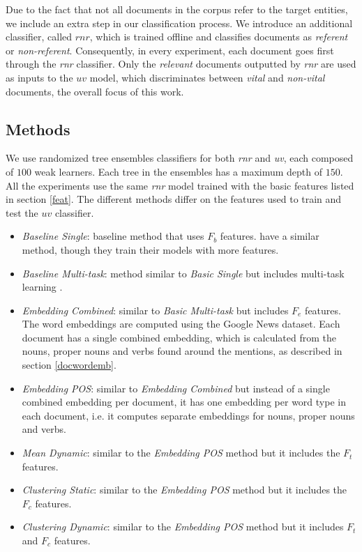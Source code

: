 \documentclass{article}
\begin{document}
Due to the fact that not all documents in the corpus refer to the target entities, we include an extra step in our classification process. We introduce an additional classifier, called $rnr$, which is trained offline and classifies documents as \emph{referent} or \emph{non-referent}.
Consequently, in every experiment, each document goes first through the \emph{rnr} classifier. Only the \emph{relevant} documents outputted by \emph{rnr} are used as inputs to the $uv$ model, which discriminates between \emph{vital} and \emph{non-vital} documents, the overall focus of this work.

\subsection{Methods}
\label{expe}

We use randomized tree ensembles classifiers \cite{GEW06a} for both \emph{rnr} and \emph{uv}, each composed of $100$ weak learners. Each tree in the ensembles has a maximum depth of $150$.
%
All the experiments use the same \emph{rnr} model trained with the basic features listed in section \ref{feat}.
The different methods differ on the features used to train and test the $uv$ classifier.

\begin{itemize}
  \item {\textit{Baseline Single}}: baseline method that uses $F_b$ features. \citet{jingang13, bellogin13} have a similar method, though they train their models with more features.
  \item {\textit{Baseline Multi-task}}: method similar to {\textit{Basic Single}} but includes multi-task learning \cite{Caruana93multitasklearning}.
  \item {\textit{Embedding Combined}}: similar to {\textit{Basic Multi-task}} but includes $F_e$ features. The word embeddings are computed using the Google News dataset. Each document has a single combined embedding, which is calculated from the nouns, proper nouns and verbs found around the mentions, as described in section \ref{docwordemb}.
  \item {\textit{Embedding POS}}: similar to {\textit{Embedding Combined}} but instead of a single combined embedding per document, it has one embedding per word type in each document, i.e. it computes separate embeddings for nouns, proper nouns and verbs. %
  \item {\textit{Mean Dynamic}}: similar to the {\textit{Embedding POS}} method but it includes the $F_t$ features.
  \item {\textit{Clustering Static}}: similar to the {\textit{Embedding POS}} method but it includes the $F_c$ features.
  \item {\textit{Clustering Dynamic}}: similar to the {\textit{Embedding POS}} method but it includes $F_t$ and $F_c$ features.
\end{itemize}
\end{document}
